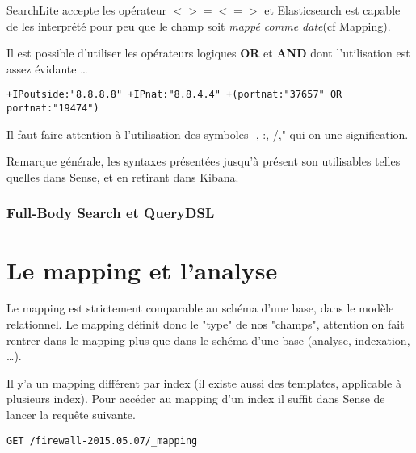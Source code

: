 SearchLite accepte les opérateur $< > =< =>$ et Elasticsearch est capable de les 
interprété pour peu que le champ soit \textit{mappé comme date}(cf Mapping).

Il est possible d'utiliser les opérateurs logiques \textbf{OR} et \textbf{AND} 
dont l'utilisation est assez évidante \ldots
\begin{lstlisting}[style=code,label={lst:APIsearchliteexample6},caption={Opérateurs logiques}]
+IPoutside:"8.8.8.8" +IPnat:"8.8.4.4" +(portnat:"37657" OR portnat:"19474")
\end{lstlisting}

Il faut faire attention à l'utilisation des symboles -, :, /," qui on une signification.


Remarque générale, les syntaxes présentées jusqu'à présent son utilisables telles
quelles dans Sense, et en retirant  dans Kibana.


\subsubsection{Full-Body Search et QueryDSL}

\section{Le mapping et l'analyse}
Le mapping est strictement comparable au schéma d'une base, dans le modèle relationnel.
Le mapping définit donc le "type" de nos "champs", attention on fait rentrer dans 
le mapping plus que dans le schéma d'une base (analyse, indexation, \ldots).

Il y'a un mapping différent par index (il existe aussi des templates, applicable 
à plusieurs index). Pour accéder au mapping d'un index il suffit dans Sense de lancer
la requête suivante.

\begin{lstlisting}[style=code,label={lst:mappingget1},caption={Obtenir un mapping}]
GET /firewall-2015.05.07/_mapping
\end{lstlisting}


